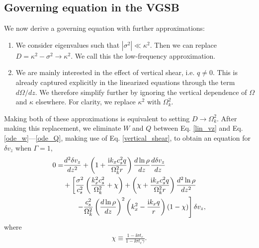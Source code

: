 \subsection{Governing equation in the VGSB}\label{approx_gov}
We now derive a governing equation with further approximations:
\begin{enumerate}
\item We consider eigenvalues such that
  $|\sigma^2|\ll \kappa^2$. Then we can replace $D=\kappa^2 -\sigma^2\to
  \kappa^2$. %
  We call this the
  low-frequency approximation. 
\item We are mainly interested in the effect of vertical shear, i.e. $q\neq
  0$. This is already captured explicitly in the linearized equations through
  the term $d\Omega/dz$. We therefore simplify
  further by ignoring the vertical dependence of $\Omega$ and $\kappa$
  elsewhere. For clarity, we replace $\kappa^2$ with $\Omega_k^2$. 
  
\end{enumerate}
Making both of these approximations is equivalent to setting 
$D\to\Omega_k^2$.  After making this replacement, we eliminate $W$ and
$Q$ between  Eq. \ref{lin_vz} and Eq. \ref{ode_w}---\ref{ode_Q},
making use of Eq. \ref{vertical_shear}, to
obtain an equation for $\delta v_z$ when $\Gamma=1$,
\begin{align}
  0 =& \frac{d^2\delta v_z}{dz^2} + \left(1 + \frac{\mathrm{i} k_x c_s^2
      q}{\Omega_k^2r}\right)\frac{d\ln\rho}{dz}\frac{d\delta
    v_z}{dz} \notag\\
  &+ \left[\frac{\sigma^2}{c_s^2}\left(\frac{k_x^2c_s^2}{\Omega_k^2} +
      \chi\right) + \left(\chi + \frac{\mathrm{i} k_x c_s^2
        q}{\Omega_k^2r}\right)\frac{d^2\ln\rho}{dz^2}\right. \notag\\
  &\phantom{+=}\left.-
    \frac{c_s^2}{\Omega_k^2}\left(\frac{d\ln\rho}{dz}\right)^2\left(k_x^2 -
      \frac{\mathrm{i} k_x q}{r}\right)
    \left(1-\chi\right) 
  \right]\delta v_z,\label{vertiso_gov}
\end{align}
where
\begin{align}
  \chi \equiv \frac{1-\ii\sigma t_c}{1-\ii\sigma t_c\gamma}.
\end{align}

